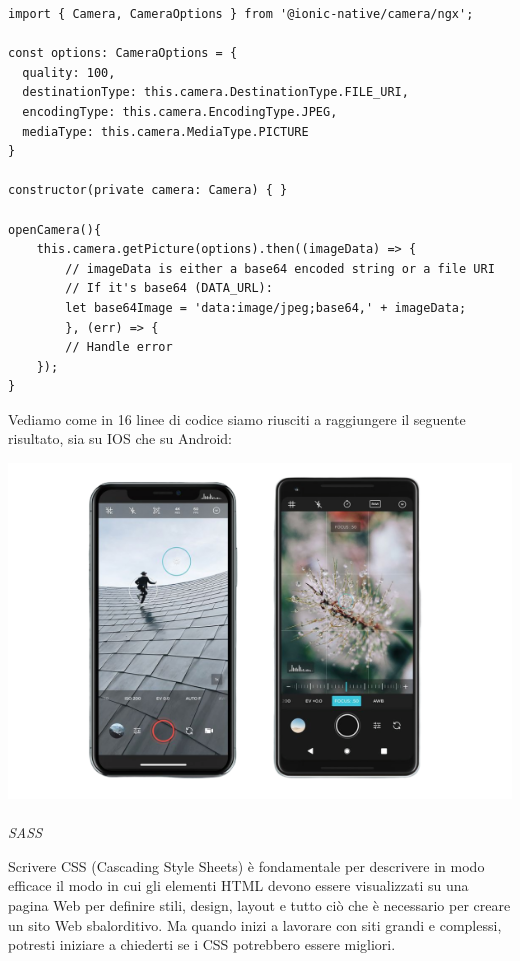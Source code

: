 \begin{lstlisting}
import { Camera, CameraOptions } from '@ionic-native/camera/ngx';

const options: CameraOptions = {
  quality: 100,
  destinationType: this.camera.DestinationType.FILE_URI,
  encodingType: this.camera.EncodingType.JPEG,
  mediaType: this.camera.MediaType.PICTURE
}

constructor(private camera: Camera) { }

openCamera(){
    this.camera.getPicture(options).then((imageData) => {
        // imageData is either a base64 encoded string or a file URI
        // If it's base64 (DATA_URL):
        let base64Image = 'data:image/jpeg;base64,' + imageData;
        }, (err) => {
        // Handle error
    });
}
\end{lstlisting}

Vediamo come in 16 linee di codice siamo riusciti a raggiungere il seguente risultato, sia su IOS che su Android:

\includegraphics[scale=0.60]{img/cap2/camera}


\paragraph{}
\textit{SASS}

Scrivere CSS (Cascading Style Sheets) è fondamentale per descrivere in modo efficace il modo in cui gli elementi HTML devono 
essere visualizzati su una pagina Web per definire stili, design, layout e tutto ciò che è necessario per creare un sito 
Web sbalorditivo. Ma quando inizi a lavorare con siti grandi e complessi, potresti iniziare a chiederti se i CSS potrebbero 
essere migliori. 

